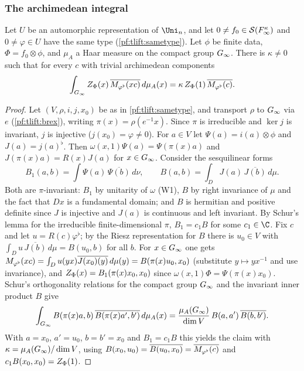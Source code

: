 \subsubsection*{The archimedean integral}
\begin{proposition}\label{pf:tlift:schur}
Let $U$ be an automorphic representation of $\Uni_n$, and let $0\ne f_0\in\mathcal{S}(F_\infty^\kappa)$ and $0\ne\varphi\in U$ have
the same type (\cref{pf:tlift:sametype}). Let $\phi$ be finite data, $\Phi=f_0\otimes\phi$, and $\mu_A$ a Haar measure on the
compact group $G_\infty$. There is $\kappa\ne0$ such that for every $c$ with trivial archimedean components
\[
  \int_{G_\infty}Z_\Phi(x)\,\overline{M_{\varphi^\flat}(xc)}\,d\mu_A(x)=\kappa\,Z_\Phi(1)\,\overline{M_{\varphi^\flat}(c)}.
\]
\end{proposition}

\begin{proof}
Let $(V,\rho,i,j,x_0)$ be as in \cref{pf:tlift:sametype}, and transport $\rho$ to $G_\infty$ via $e$ (\cref{pf:tlift:brex}),
writing $\pi(x)=\rho(e^{-1}x)$. Since $\pi$ is irreducible and $\ker j$ is invariant, $j$ is injective ($j(x_0)=\varphi\ne0$).
For $a\in V$ let $\Psi(a)=i(a)\otimes\phi$ and $J(a)=j(a)^\flat$. Then $\omega(x,1)\Psi(a)=\Psi(\pi(x)a)$ and
$J(\pi(x)a)=R(x)J(a)$ for $x\in G_\infty$. Consider the sesquilinear forms
\[
  B_1(a,b)=\int\Psi(a)\,\overline{\Psi(b)}\,d\nu,\qquad B(a,b)=\int_DJ(a)\,\overline{J(b)}\,d\mu.
\]
Both are $\pi$-invariant: $B_1$ by unitarity of $\omega$ (W1), $B$ by right invariance of $\mu$ and the fact that
$Dx$ is a fundamental domain; and $B$ is
hermitian and positive definite since $J$ is injective and $J(a)$ is continuous and left invariant. By
Schur's lemma for the irreducible finite-dimensional $\pi$, $B_1=c_1B$ for some $c_1\in\C$. Fix $c$ and let $u=R(c)\varphi^\flat$; by the
Riesz representation for $B$ there is $u_0\in V$ with $\int_Du\,\overline{J(b)}\,d\mu=B(u_0,b)$ for all $b$. For $x\in G_\infty$ one
gets $M_{\varphi^\flat}(xc)=\int_Du(yx)\overline{J(x_0)(y)}\,d\mu(y)=B(\pi(x)u_0,x_0)$ (substitute $y\mapsto yx^{-1}$ and use
invariance), and $Z_\Phi(x)=B_1(\pi(x)x_0,x_0)$ since $\omega(x,1)\Phi=\Psi(\pi(x)x_0)$.
Schur's orthogonality relations for the compact group $G_\infty$ and the invariant inner product $B$ give
\[
  \int_{G_\infty}B(\pi(x)a,b)\,\overline{B(\pi(x)a',b')}\,d\mu_A(x)=\frac{\mu_A(G_\infty)}{\dim V}\,B(a,a')\,\overline{B(b,b')}.
\]
With $a=x_0$, $a'=u_0$, $b=b'=x_0$ and $B_1=c_1B$ this yields the claim with
$\kappa=\mu_A(G_\infty)/\dim V$, using $B(x_0,u_0)=\overline{B(u_0,x_0)}=\overline{M_{\varphi^\flat}(c)}$ and
$c_1B(x_0,x_0)=Z_\Phi(1)$.
\end{proof}

